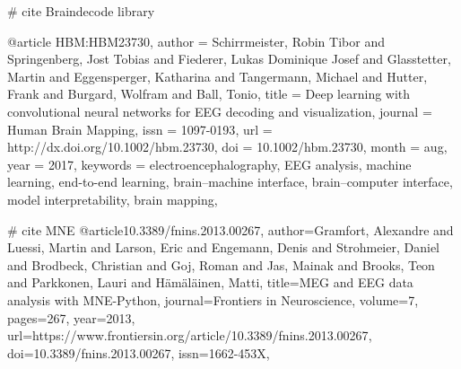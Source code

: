 # cite Braindecode library

@article {HBM:HBM23730,
author = {Schirrmeister, Robin Tibor and Springenberg, Jost Tobias and Fiederer,
  Lukas Dominique Josef and Glasstetter, Martin and Eggensperger, Katharina and Tangermann, Michael and
  Hutter, Frank and Burgard, Wolfram and Ball, Tonio},
title = {Deep learning with convolutional neural networks for EEG decoding and visualization},
journal = {Human Brain Mapping},
issn = {1097-0193},
url = {http://dx.doi.org/10.1002/hbm.23730},
doi = {10.1002/hbm.23730},
month = {aug},
year = {2017},
keywords = {electroencephalography, EEG analysis, machine learning, end-to-end learning, brain–machine interface,
  brain–computer interface, model interpretability, brain mapping},
}

# cite MNE
@article{10.3389/fnins.2013.00267,
author={Gramfort, Alexandre and Luessi, Martin and Larson, Eric and Engemann,
        Denis and Strohmeier, Daniel and Brodbeck, Christian and Goj, Roman and Jas,
        Mainak and Brooks, Teon and Parkkonen, Lauri and Hämäläinen, Matti},
title={{MEG and EEG data analysis with MNE-Python}},
journal={Frontiers in Neuroscience},
volume={7},
pages={267},
year={2013},
url={https://www.frontiersin.org/article/10.3389/fnins.2013.00267},
doi={10.3389/fnins.2013.00267},
issn={1662-453X},
}